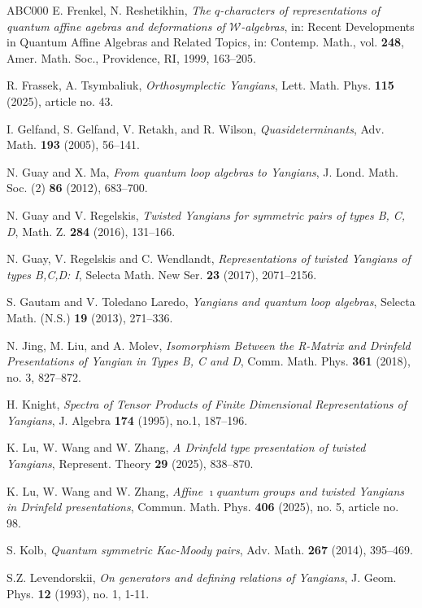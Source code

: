 \documentclass[11pt,reqno]{amsart}
\numberwithin{equation}{section}
\theoremstyle{definition}
\theoremstyle{remark}
\begin{document}
\begin{thebibliography}{ABC000}
E. Frenkel, N. Reshetikhin, 
\textit{The $q$-characters of representations of quantum affine agebras and
deformations of $\mathcal W$-algebras}, in: Recent Developments in Quantum Affine Algebras and Related Topics, in: Contemp.
Math., vol. \textbf{248}, Amer. Math. Soc., Providence, RI, 1999, 163--205.

R. Frassek, A. Tsymbaliuk, 
{\it Orthosymplectic Yangians}, Lett. Math. Phys. \textbf{115} (2025), article no. 43.

I. Gelfand, S. Gelfand, V. Retakh, and R. Wilson, {\it Quasideterminants}, Adv. Math. \textbf{193} (2005), 56--141.

N. Guay and X. Ma,
\textit{From quantum loop algebras to Yangians},
J. Lond. Math. Soc. (2) \textbf{86} (2012), 683--700.

N. Guay and V. Regelskis, {\em Twisted Yangians for symmetric pairs of types B, C, D}, Math. Z. \textbf{284} (2016), 131--166.

N. Guay, V. Regelskis and C. Wendlandt, {\em Representations of twisted Yangians of types B,C,D: I}, Selecta Math. New Ser. \textbf{23} (2017), 2071--2156.

S. Gautam and V. Toledano Laredo, 
{\em Yangians and quantum loop algebras}, Selecta Math. (N.S.) {\bf 19} (2013), 271--336.

N. Jing, M. Liu, and A. Molev,
{\it Isomorphism Between the R-Matrix and Drinfeld Presentations of Yangian in Types B, C and D}, Comm. Math. Phys. \textbf{361} (2018), no. 3, 827–872.

H. Knight,
{\it Spectra of Tensor Products of Finite Dimensional Representations of Yangians}, J. Algebra  \textbf{174} (1995), no.1, 187--196.

K. Lu, W. Wang and W. Zhang,
{\it A Drinfeld type presentation of twisted Yangians}, Represent. Theory \textbf{29} (2025), 838--870.

K. Lu, W. Wang and W. Zhang,
{\it Affine $\imath$quantum groups and twisted Yangians in Drinfeld presentations}, Commun. Math. Phys. \textbf{406} (2025), no. 5, article no. 98.

 S. Kolb,
{\em Quantum symmetric Kac-Moody pairs}, Adv. Math. {\bf 267} (2014), 395--469.

S.Z. Levendorskii,
{\it On generators and defining relations of Yangians},
J. Geom. Phys. \textbf{12} (1993), no. 1, 1-11.


\end{thebibliography}
\end{document}
